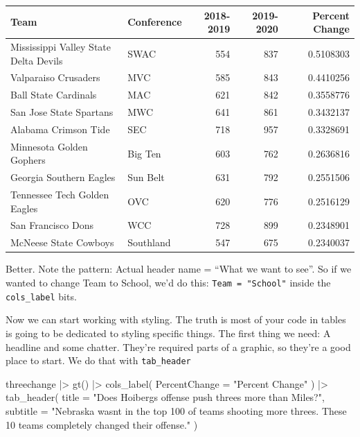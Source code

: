\documentclass[
  letterpaper,
  DIV=11,
  numbers=noendperiod]{scrreprt}
\newenvironment{Shaded}{\begin{snugshade}}{\end{snugshade}}
\newcommand{\AttributeTok}[1]{\textcolor[rgb]{0.40,0.45,0.13}{#1}}
\newcommand{\FunctionTok}[1]{\textcolor[rgb]{0.28,0.35,0.67}{#1}}
\newcommand{\NormalTok}[1]{\textcolor[rgb]{0.00,0.23,0.31}{#1}}
\newcommand{\SpecialCharTok}[1]{\textcolor[rgb]{0.37,0.37,0.37}{#1}}
\newcommand{\StringTok}[1]{\textcolor[rgb]{0.13,0.47,0.30}{#1}}
\begin{document}
\begin{longtable}{llrrr}
\toprule
Team & Conference & 2018-2019 & 2019-2020 & Percent Change \\ 
\midrule\addlinespace[2.5pt]
Mississippi Valley State Delta Devils & SWAC & 554 & 837 & 0.5108303 \\ 
Valparaiso Crusaders & MVC & 585 & 843 & 0.4410256 \\ 
Ball State Cardinals & MAC & 621 & 842 & 0.3558776 \\ 
San Jose State Spartans & MWC & 641 & 861 & 0.3432137 \\ 
Alabama Crimson Tide & SEC & 718 & 957 & 0.3328691 \\ 
Minnesota Golden Gophers & Big Ten & 603 & 762 & 0.2636816 \\ 
Georgia Southern Eagles & Sun Belt & 631 & 792 & 0.2551506 \\ 
Tennessee Tech Golden Eagles & OVC & 620 & 776 & 0.2516129 \\ 
San Francisco Dons & WCC & 728 & 899 & 0.2348901 \\ 
McNeese State Cowboys & Southland & 547 & 675 & 0.2340037 \\ 
\bottomrule
\end{longtable}

Better. Note the pattern: Actual header name = ``What we want to see''.
So if we wanted to change Team to School, we'd do this:
\texttt{Team\ =\ "School"} inside the \texttt{cols\_label} bits.

Now we can start working with styling. The truth is most of your code in
tables is going to be dedicated to styling specific things. The first
thing we need: A headline and some chatter. They're required parts of a
graphic, so they're a good place to start. We do that with
\texttt{tab\_header}

\begin{Shaded}
\begin{Highlighting}[]
\NormalTok{threechange }\SpecialCharTok{|\textgreater{}} 
  \FunctionTok{gt}\NormalTok{() }\SpecialCharTok{|\textgreater{}} 
  \FunctionTok{cols\_label}\NormalTok{(}
    \AttributeTok{PercentChange =} \StringTok{"Percent Change"}
\NormalTok{  ) }\SpecialCharTok{|\textgreater{}}
  \FunctionTok{tab\_header}\NormalTok{(}
    \AttributeTok{title =} \StringTok{"Does Hoiberg\textquotesingle{}s offense push threes more than Miles?"}\NormalTok{,}
    \AttributeTok{subtitle =} \StringTok{"Nebraska wasn\textquotesingle{}t in the top 100 of teams shooting more threes. These 10 teams completely changed their offense."}
\NormalTok{  )}
\end{Highlighting}
\end{Shaded}
\end{document}
